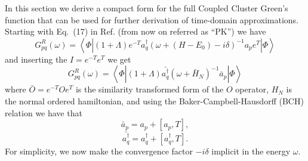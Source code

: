 \documentclass[aps,prb,preprint,groupaddress,floatfix]{revtex4}
\begin{document}
In this section we derive a compact form for the full Coupled Cluster Green's function that can be used for further derivation of time-domain approximations. Starting with Eq.\ (17)
in Ref.  (from now on referred as ``PK'') we have
\begin{equation}
\label{eq:GPK1}
G^R_{pq} (\omega) = \left< \Phi \left| (1+\Lambda) e^{-T} a^{\dagger}_q
\left( \omega + (H-E_0) -i\delta \right)^{-1}
a_p e^{T} \right| \Phi \right>
\end{equation}
and inserting the $I=e^{-T}e^{T}$ we get
\begin{equation}
\label{eq:GPK2}
G^R_{pq} (\omega) = \left< \Phi \left| (1+\Lambda) \bar{a^{\dagger}_q}
\left( \omega + \bar{H}_N \right)^{-1}
\bar{a}_p \right| \Phi \right>
\end{equation}
where $\bar{O} = e^{-T}Oe^{T}$ is the similarity transformed form of the $O$
operator, $H_N$ is the normal ordered hamiltonian, and using the
Baker-Campbell-Hausdorff (BCH) relation we have that
\begin{equation}
\label{eq:apbar}
\bar{a}_p = a_p + [a_p,T],
\end{equation}
\begin{equation}
\label{eq:aqbar}
\bar{a^{\dagger}_q} = a^{\dagger}_q + [a^{\dagger}_q,T].
\end{equation}
For simplicity, we now make the convergence factor $-i\delta$ implicit in the energy $\omega$.
\end{document}
